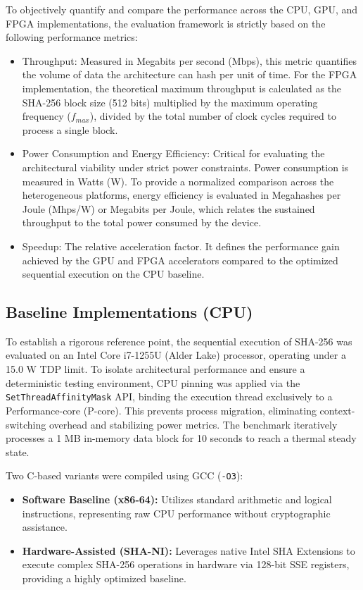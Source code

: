 \documentclass[conference]{IEEEtran}
\begin{document}
To objectively quantify and compare the performance across the CPU, GPU, and FPGA implementations, the evaluation framework is strictly based on the following performance metrics:
\begin{itemize}
    \item Throughput: Measured in Megabits per second (Mbps), this metric quantifies the volume of data the architecture can hash per unit of time. For the FPGA implementation, the theoretical maximum throughput is calculated as the SHA-256 block size (512 bits) multiplied by the maximum operating frequency ($f_{max}$), divided by the total number of clock cycles required to process a single block.
    \item Power Consumption and Energy Efficiency: Critical for evaluating the architectural viability under strict power constraints. Power consumption is measured in Watts (W). To provide a normalized comparison across the heterogeneous platforms, energy efficiency is evaluated in Megahashes per Joule (Mhps/W) or Megabits per Joule, which relates the sustained throughput to the total power consumed by the device.
    \item Speedup: The relative acceleration factor. It defines the performance gain achieved by the GPU and FPGA accelerators compared to the optimized sequential execution on the CPU baseline.
\end{itemize}

\subsection{Baseline Implementations (CPU)}
To establish a rigorous reference point, the sequential execution of SHA-256 was evaluated on an Intel Core i7-1255U (Alder Lake) processor, operating under a 15.0 W TDP limit. To isolate architectural performance and ensure a deterministic testing environment, CPU pinning was applied via the \texttt{SetThreadAffinityMask} API, binding the execution thread exclusively to a Performance-core (P-core). This prevents process migration, eliminating context-switching overhead and stabilizing power metrics. The benchmark iteratively processes a 1 MB in-memory data block for 10 seconds to reach a thermal steady state.

Two C-based variants were compiled using GCC (\texttt{-O3}):
\begin{itemize}
    \item \textbf{Software Baseline (x86-64):} Utilizes standard arithmetic and logical instructions, representing raw CPU performance without cryptographic assistance.
    \item \textbf{Hardware-Assisted (SHA-NI):} Leverages native Intel SHA Extensions to execute complex SHA-256 operations in hardware via 128-bit SSE registers, providing a highly optimized baseline.
\end{itemize}
\end{document}
